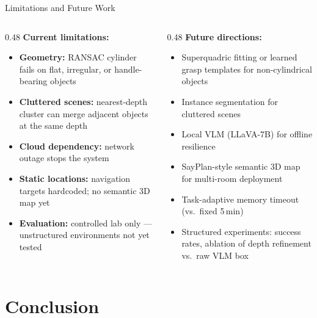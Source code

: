 \documentclass[aspectratio=169, 10pt]{beamer}
\begin{document}
\begin{frame}{Limitations and Future Work}
  \begin{columns}[T]
    \begin{column}{0.48\textwidth}
      \textbf{Current limitations:}
      \begin{itemize}\small
        \item \textbf{Geometry:} RANSAC cylinder fails on flat,
              irregular, or handle-bearing objects
        \item \textbf{Cluttered scenes:} nearest-depth cluster
              can merge adjacent objects at the same depth
        \item \textbf{Cloud dependency:} network outage
              stops the system
        \item \textbf{Static locations:} navigation targets
              hardcoded; no semantic 3D map yet
        \item \textbf{Evaluation:} controlled lab only ---
              unstructured environments not yet tested
      \end{itemize}
    \end{column}

    \begin{column}{0.48\textwidth}
      \textbf{Future directions:}
      \begin{itemize}\small
        \item Superquadric fitting or learned grasp templates
              for non-cylindrical objects
        \item Instance segmentation for cluttered scenes
        \item Local VLM (LLaVA-7B) for offline resilience
        \item SayPlan-style semantic 3D map for multi-room
              deployment
        \item Task-adaptive memory timeout (vs.\ fixed 5\,min)
        \item Structured experiments: success rates,
              ablation of depth refinement vs.\ raw VLM box
      \end{itemize}
    \end{column}
  \end{columns}
\end{frame}

\section{Conclusion}
\end{document}
